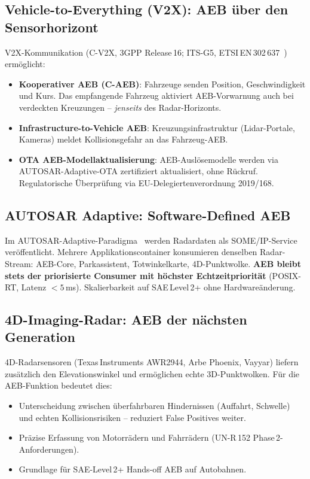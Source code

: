 \documentclass[a4paper,12pt]{article}
\theoremstyle{definition}
\begin{document}
\subsection{Vehicle-to-Everything (V2X): AEB \"uber den Sensorhorizont}

V2X-Kommunikation (C-V2X, 3GPP Release\,16; ITS-G5,
ETSI\,EN\,302\,637~\cite{etsi302637}) erm\"oglicht:

\begin{itemize}
  \item \textbf{Kooperativer AEB (C-AEB)}: Fahrzeuge senden Position,
        Geschwindigkeit und Kurs. Das empfangende Fahrzeug aktiviert
        AEB-Vorwarnung auch bei verdeckten Kreuzungen -- \emph{jenseits}
        des Radar-Horizonts.
  \item \textbf{Infrastructure-to-Vehicle AEB}: Kreuzungsinfrastruktur
        (Lidar-Portale, Kameras) meldet Kollisionsgefahr an das
        Fahrzeug-AEB.
  \item \textbf{OTA AEB-Modellaktualisierung}: AEB-Ausl\"osemodelle
        werden via AUTOSAR-Adaptive-OTA zertifiziert aktualisiert,
        ohne R\"uckruf. Regulatorische \"Uberpr\"ufung via
        EU-Delegiertenverordnung 2019/168.
\end{itemize}

\subsection{AUTOSAR Adaptive: Software-Defined AEB}

Im AUTOSAR-Adaptive-Paradigma~\cite{autosar2023adaptive} werden
Radardaten als SOME/IP-Service ver\"offent\-licht. Mehrere
Applikationscontainer konsumieren denselben Radar-Stream:
AEB-Core, Parkassistent, Totwinkelkarte, 4D-Punktwolke.
\textbf{AEB bleibt stets der priorisierte Consumer mit h\"ochster
Echtzeitpriorit\"at} (POSIX-RT, Latenz $<5$\,ms).
Skalierbarkeit auf SAE\,Level\,2+ ohne Hardware\"anderung.

\subsection{4D-Imaging-Radar: AEB der n\"achsten Generation}

4D-Radarsensoren (Texas\,Instruments AWR2944, Arbe Phoenix, Vayyar)
liefern zus\"atzlich den Elevationswinkel und erm\"oglichen echte
3D-Punktwolken. F\"ur die AEB-Funktion bedeutet dies:

\begin{itemize}
  \item Unterscheidung zwischen \"uberfahrbaren Hindernissen
        (Auffahrt, Schwelle) und echten Kollisionsrisiken
        -- reduziert False Positives weiter.
  \item Pr\"azise Erfassung von Motorr\"adern und Fahrr\"adern
        (UN-R\,152 Phase\,2-Anforderun\-gen).
  \item Grundlage f\"ur SAE-Level\,2+ Hands-off AEB auf Autobahnen.
\end{itemize}
\end{document}
